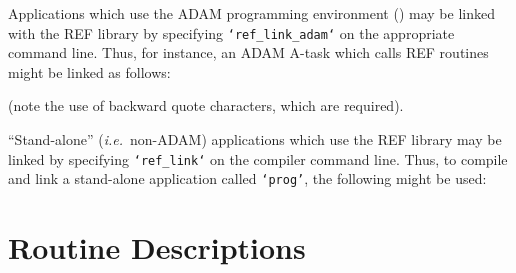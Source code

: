\documentclass[twoside,11pt,nolof]{starlink}
\begin{document}
Applications which use the ADAM programming environment
() may be linked with the REF library by specifying
\texttt{`ref\_link\_adam`} on the appropriate command line. Thus, for
instance, an ADAM A-task which calls REF routines might be linked as
follows:

\begin{terminalv}
\end{terminalv}

(note the use of backward quote characters, which are required).

``Stand-alone'' (\emph{i.e.}\ non-ADAM) applications which use the REF library
may be linked by specifying \texttt{`ref\_link`} on the compiler
command line. Thus, to compile and link a stand-alone application
called \texttt{`prog'}, the following might be used:

\begin{terminalv}
\end{terminalv}


\appendix
\cleardoublepage
\section{Routine Descriptions}
\label{routine_descriptions}
\end{document}
